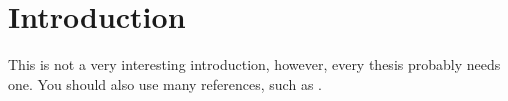 
\chapter{Introduction}


This is not a very interesting introduction, however, every thesis probably
needs one. You should also use many references, such as \cite{changepoint}.
